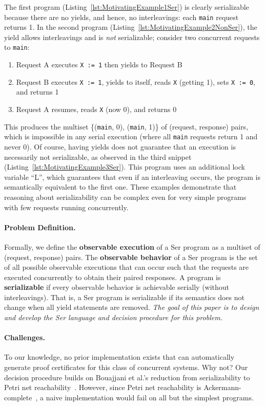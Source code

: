 %
The first program (Listing~\ref{lst:MotivatingExample1Ser}) is clearly serializable because there are no yields, and hence, no interleavings: each \texttt{main} request returns 1.
In the second program (Listing~\ref{lst:MotivatingExample2NonSer}), the yield allows interleavings and is \emph{not} serializable; consider two concurrent requests to \texttt{main}:
\begin{enumerate}
\item Request A executes \texttt{X := 1} then yields to Request B
\item Request B executes \texttt{X := 1}, yields to itself, reads \texttt{X} (getting 1), sets \texttt{X := 0}, and returns 1
\item Request A resumes, reads \texttt{X} (now 0), and returns 0
\end{enumerate}
This produces the multiset \{(\texttt{main}, 0), (\texttt{main}, 1)\} of (request, response) pairs, which is impossible in any serial execution (where all \texttt{main} requests return 1 and never 0).
Of course, having yields does not guarantee that an execution is necessarily not serializable, as observed in the third snippet (Listing~\ref{lst:MotivatingExample3Ser}). This program uses an additional lock variable ``L'', which guarantees that even if an interleaving occurs, the program is semantically equivalent to the first one.
%
These examples demonstrate that reasoning about serializability can be complex even for very simple programs with few requests running concurrently.

\paragraph{Problem Definition.}
Formally, we define the \textbf{observable execution} of a Ser program as a multiset of (request, response) pairs. The \textbf{observable behavior} of a Ser program is the set of all possible observable executions that can occur such that the requests are executed concurrently to obtain their paired responses.
A program is \textbf{serializable} if every observable behavior is achievable serially (without interleavings). That is, a Ser program is serializable if its semantics does not change when all yield statements are removed.
%
\emph{The goal of this paper is to design and develop the Ser language and decision procedure for this problem.}

\paragraph{Challenges.}
To our knowledge, no prior implementation exists that can automatically generate proof certificates for this class of concurrent systems.
Why not?
Our decision procedure builds on Bouajjani et al.'s reduction from serializability to Petri net reachability~\cite{BoEmEnHa13}. However, since Petri net reachability is Ackermann-complete~\cite{CzWo22}, a naive implementation would fail on all but the simplest programs. 

